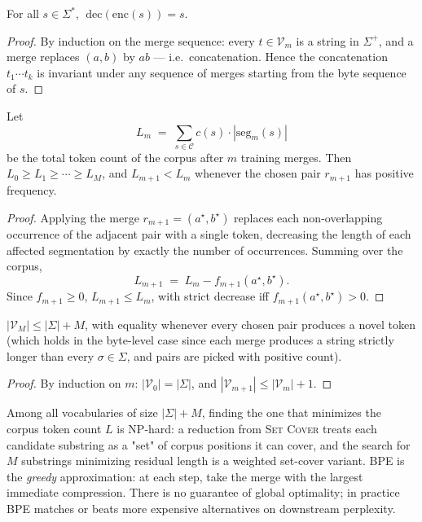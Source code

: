 \begin{theorem}
For all $s \in \Sigma^*$, $\;\mathrm{dec}(\mathrm{enc}(s)) = s$.
\end{theorem}

\begin{proof}
By induction on the merge sequence: every $t \in \mathcal{V}_m$ is a string in $\Sigma^+$, and a merge replaces $(a,b)$ by $ab$ — i.e.\ concatenation. Hence the concatenation $t_1 \cdots t_k$ is invariant under any sequence of merges starting from the byte sequence of $s$. \qedhere
\end{proof}

\begin{theorem}
Let
\[
L_m \;=\; \sum_{s \in \mathcal{C}} c(s) \cdot |\mathrm{seg}_m(s)|
\]
be the total token count of the corpus after $m$ training merges. Then $L_0 \geq L_1 \geq \cdots \geq L_M$, and $L_{m+1} < L_m$ whenever the chosen pair $r_{m+1}$ has positive frequency.
\end{theorem}

\begin{proof}
Applying the merge $r_{m+1} = (a^\star, b^\star)$ replaces each non-overlapping occurrence of the adjacent pair with a single token, decreasing the length of each affected segmentation by exactly the number of occurrences. Summing over the corpus,
\[
L_{m+1} \;=\; L_m - f_{m+1}(a^\star, b^\star).
\]
Since $f_{m+1} \geq 0$, $L_{m+1} \leq L_m$, with strict decrease iff $f_{m+1}(a^\star, b^\star) > 0$. \qedhere
\end{proof}

\begin{proposition}
$|\mathcal{V}_M| \leq |\Sigma| + M$, with equality whenever every chosen pair produces a novel token (which holds in the byte-level case since each merge produces a string strictly longer than every $\sigma \in \Sigma$, and pairs are picked with positive count).
\end{proposition}

\begin{proof}
By induction on $m$: $|\mathcal{V}_0| = |\Sigma|$, and $|\mathcal{V}_{m+1}| \leq |\mathcal{V}_m| + 1$. \qedhere
\end{proof}

\begin{remark}
Among all vocabularies of size $|\Sigma| + M$, finding the one that minimizes the corpus token count $L$ is NP-hard: a reduction from \textsc{Set Cover} treats each candidate substring as a "set" of corpus positions it can cover, and the search for $M$ substrings minimizing residual length is a weighted set-cover variant. BPE is the \emph{greedy} approximation: at each step, take the merge with the largest immediate compression. There is no guarantee of global optimality; in practice BPE matches or beats more expensive alternatives on downstream perplexity.
\end{remark}

